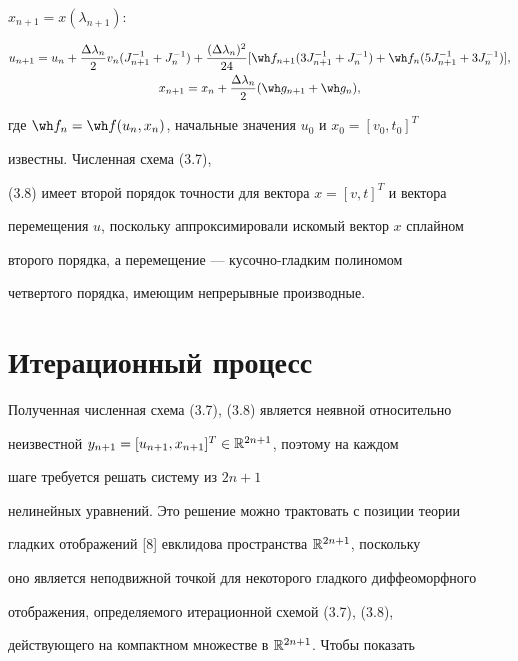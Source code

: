 $x_{n+1}=x(\lambda_{n+1})$: 


\begin{gather} 


u_{n+1}=u_n+\frac{\Delta\lambda_n}{2}v_n(J^{-1}_{n+1}+J^{-1}_n)+ 


\frac{(\Delta\lambda_n)^2}{24}[\wh f_{n+1}(3J^{-1}_{n+1}+ 


J^{-1}_n)+\wh f_n(5J^{-1}_{n+1}+3J^{-1}_n)],\\ 


% 


x_{n+1}=x_n+\frac{\Delta\lambda_n}{2}(\wh g_{n+1}+\wh g_n), 


\end{gather} 


где $\wh f_n=\wh f(u_n,x_n)$, начальные значения $u_0$ и $x_0=[v_0,t_0]^T$ 


известны. Численная схема (3.7), 


(3.8) имеет второй порядок точности для вектора $x=[v,t]^T$ и вектора 


перемещения $u$, поскольку аппроксимировали искомый вектор $x$ сплайном 


второго порядка, а перемещение --- кусочно-гладким полиномом 


четвертого порядка, имеющим непрерывные производные. 





 


\section{Итерационный процесс} 


 


Полученная численная схема (3.7), (3.8) является неявной относительно 


неизвестной $y_{n+1}=[u_{n+1},x_{n+1}]^T\in\Bbb R^{2n+1}$, поэтому на каждом 


шаге требуется решать систему из $2n+1$ 


нелинейных уравнений. Это решение можно трактовать с позиции теории 


гладких отображений [8] евклидова пространства $\Bbb R^{2n+1}$, поскольку 


оно является неподвижной точкой для некоторого гладкого диффеоморфного 


отображения, определяемого итерационной схемой (3.7), (3.8), 


действующего на компактном множестве в $\Bbb R^{2n+1}$. Чтобы показать 


